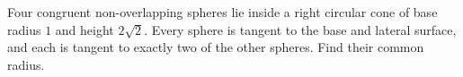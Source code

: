 Four congruent non-overlapping spheres lie inside a right circular cone of base radius $1$ and height $2\sqrt2$. Every sphere is tangent to the base and lateral surface, and each is tangent to exactly two of the other spheres. Find their common radius.
